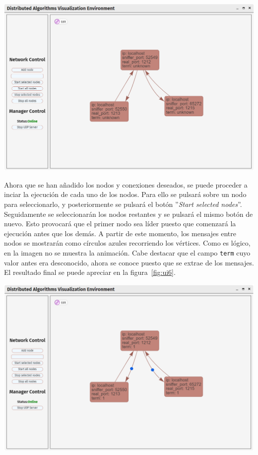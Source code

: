 {
\centering
\includegraphics[width=0.9\linewidth]{imagenes/ui5}
\label{fig:ui5}
}

Ahora que se han añadido los nodos y conexiones deseados, se puede proceder a inciar la ejecución de cada uno de los nodos. Para ello se pulsará sobre un nodo para seleccionarlo, y posteriormente se pulsará el botón ''\textit{Start selected nodes}''. Seguidamente se seleccionarán los nodos restantes y se pulsará el mismo botón de nuevo. Esto provocará que el primer nodo sea líder puesto que comenzará la ejecución antes que los demás. A partir de este momento, los mensajes entre nodos se mostrarán como círculos azules recorriendo los vértices. Como es lógico, en la imagen no se muestra la animación. Cabe destacar que el campo \texttt{term} cuyo valor antes era desconocido, ahora se conoce puesto que se extrae de los mensajes. El resultado final se puede apreciar en la figura~\ref{fig:ui6}.

{
\centering
\includegraphics[width=0.9\linewidth]{imagenes/ui6}
\label{fig:ui6}
}

